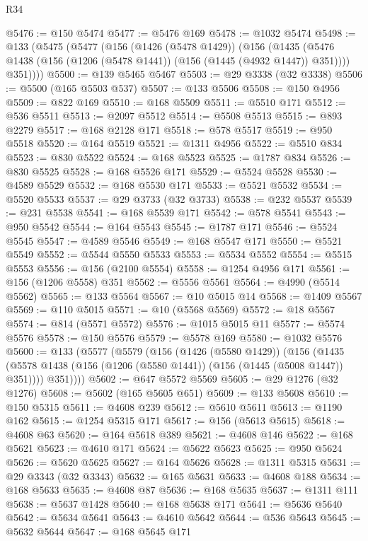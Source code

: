 \begin{lexlean}{R34}
\begin{coremodule}
@5476 := @150 @5474
@5477 := @5476 @169
@5478 := @1032 @5474
@5498 := @133
    (@5475
      (@5477
        (@156
          (@1426 (@5478 @1429))
          (@156
            (@1435 (@5476 @1438 (@156 (@1206 (@5478 @1441)) (@156 (@1445 (@4932 @1447)) @351))))
            @351))))
@5500 := @139 @5465 @5467
@5503 := @29 @3338 (@32 @3338)
@5506 := @5500 (@165 @5503 @537)
@5507 := @133 @5506
@5508 := @150 @4956
@5509 := @822 @169
@5510 := @168 @5509
@5511 := @5510 @171
@5512 := @536 @5511
@5513 := @2097 @5512
@5514 := @5508 @5513
@5515 := @893 @2279
@5517 := @168 @2128 @171
@5518 := @578 @5517
@5519 := @950 @5518
@5520 := @164 @5519
@5521 := @1311 @4956
@5522 := @5510 @834
@5523 := @830 @5522
@5524 := @168 @5523
@5525 := @1787 @834
@5526 := @830 @5525
@5528 := @168 @5526 @171
@5529 := @5524 @5528
@5530 := @4589 @5529
@5532 := @168 @5530 @171
@5533 := @5521 @5532
@5534 := @5520 @5533
@5537 := @29 @3733 (@32 @3733)
@5538 := @232 @5537
@5539 := @231 @5538
@5541 := @168 @5539 @171
@5542 := @578 @5541
@5543 := @950 @5542
@5544 := @164 @5543
@5545 := @1787 @171
@5546 := @5524 @5545
@5547 := @4589 @5546
@5549 := @168 @5547 @171
@5550 := @5521 @5549
@5552 := @5544 @5550 @5533
@5553 := @5534 @5552
@5554 := @5515 @5553
@5556 := @156 (@2100 @5554)
@5558 := @1254 @4956 @171
@5561 := @156 (@1206 @5558) @351
@5562 := @5556 @5561
@5564 := @4990 (@5514 @5562)
@5565 := @133 @5564
@5567 := @10 @5015 @14
@5568 := @1409 @5567
@5569 := @110 @5015
@5571 := @10 (@5568 @5569)
@5572 := @18 @5567
@5574 := @814 (@5571 @5572)
@5576 := @1015 @5015 @11
@5577 := @5574 @5576
@5578 := @150 @5576
@5579 := @5578 @169
@5580 := @1032 @5576
@5600 := @133
    (@5577
      (@5579
        (@156
          (@1426 (@5580 @1429))
          (@156
            (@1435 (@5578 @1438 (@156 (@1206 (@5580 @1441)) (@156 (@1445 (@5008 @1447)) @351))))
            @351))))
@5602 := @647 @5572 @5569
@5605 := @29 @1276 (@32 @1276)
@5608 := @5602 (@165 @5605 @651)
@5609 := @133 @5608
@5610 := @150 @5315
@5611 := @4608 @239
@5612 := @5610 @5611
@5613 := @1190 @162
@5615 := @1254 @5315 @171
@5617 := @156 (@5613 @5615)
@5618 := @4608 @63
@5620 := @164 @5618 @389
@5621 := @4608 @146
@5622 := @168 @5621
@5623 := @4610 @171
@5624 := @5622 @5623
@5625 := @950 @5624
@5626 := @5620 @5625
@5627 := @164 @5626
@5628 := @1311 @5315
@5631 := @29 @3343 (@32 @3343)
@5632 := @165 @5631
@5633 := @4608 @188
@5634 := @168 @5633
@5635 := @4608 @87
@5636 := @168 @5635
@5637 := @1311 @111
@5638 := @5637 @1428
@5640 := @168 @5638 @171
@5641 := @5636 @5640
@5642 := @5634 @5641
@5643 := @4610 @5642
@5644 := @536 @5643
@5645 := @5632 @5644
@5647 := @168 @5645 @171

\end{coremodule}
\end{lexlean}
